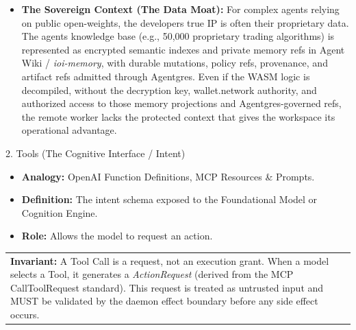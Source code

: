\documentclass[
  11pt,
]{article}
\providecommand{\tightlist}{%
  \setlength{\itemsep}{0pt}\setlength{\parskip}{0pt}}
\begin{document}
\begin{itemize}
  all cases, the model or program hash, input commitments, output
  commitments, policy hash, leakage bounds, and verifier requirements
  are bound into the applicable \emph{CustodyProof}, proof refs, and
  receipt bundle. This reduces
  exposure under the declared substrate threat model and makes any
  authority-critical claim dependent on receipt completeness, not on
  trust in the execution venue.
\item
  \textbf{The Sovereign Context (The Data Moat):} For complex agents
  relying on public open-weights, the developer\textquotesingle s true
  IP is often their proprietary data. The agent\textquotesingle s
  knowledge base (e.g., 50,000 proprietary trading algorithms) is
  represented as encrypted semantic indexes and private memory refs in
  Agent Wiki / \emph{ioi-memory}, with durable mutations, policy refs,
  provenance, and artifact refs admitted through Agentgres. Even if the
  WASM logic is decompiled, without the decryption key, wallet.network
  authority, and authorized access to those memory projections and
  Agentgres-governed refs, the remote worker lacks the protected context
  that gives the workspace its operational advantage.
\end{itemize}

2. Tools (The Cognitive Interface / Intent)

\begin{itemize}
\tightlist
\item
  \textbf{Analogy:} OpenAI Function Definitions, MCP Resources \&
  Prompts.
\item
  \textbf{Definition:} The intent schema exposed to the Foundational
  Model or Cognition Engine.
\item
  \textbf{Role:} Allows the model to request an action.
\end{itemize}

\begin{longtable}[]{@{}>{\raggedright\arraybackslash}p{\linewidth}@{}}
\toprule\noalign{}
 \\
\midrule\noalign{}
\endhead
\bottomrule\noalign{}
\endlastfoot
\textbf{Invariant:}\emph{\textbf{ }}A Tool Call is a request, not an
execution grant. When a model selects a Tool, it generates a
\emph{ActionRequest} (derived from the MCP CallToolRequest standard).
This request is treated as untrusted input and MUST be validated by the
daemon effect boundary before any side effect occurs. \\
\end{longtable}
\end{document}
